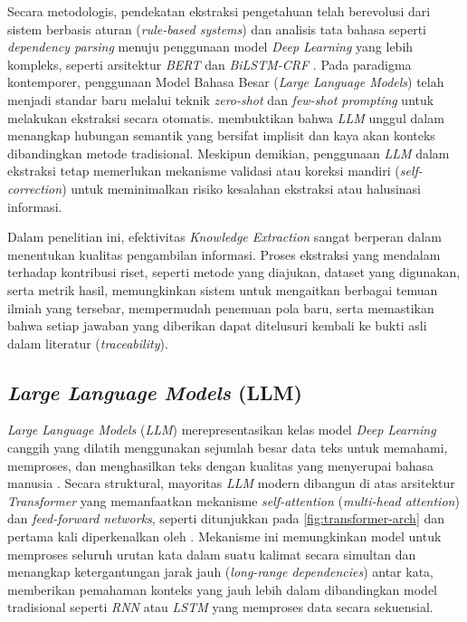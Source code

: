 Secara metodologis, pendekatan ekstraksi pengetahuan telah berevolusi dari sistem berbasis aturan (\textit{rule-based systems}) dan analisis tata bahasa seperti \textit{dependency parsing} menuju penggunaan model \textit{Deep Learning} yang lebih kompleks, seperti arsitektur \textit{BERT} dan \textit{BiLSTM-CRF} \citep{han2025ragvsgraphragsystematic}. Pada paradigma kontemporer, penggunaan Model Bahasa Besar (\textit{Large Language Models}) telah menjadi standar baru melalui teknik \textit{zero-shot} dan \textit{few-shot prompting} untuk melakukan ekstraksi secara otomatis. \cite{sanmartin2024kgragbridginggapknowledge} membuktikan bahwa \textit{LLM} unggul dalam menangkap hubungan semantik yang bersifat implisit dan kaya akan konteks dibandingkan metode tradisional. Meskipun demikian, penggunaan \textit{LLM} dalam ekstraksi tetap memerlukan mekanisme validasi atau koreksi mandiri (\textit{self-correction}) untuk meminimalkan risiko kesalahan ekstraksi atau halusinasi informasi.

Dalam penelitian ini, efektivitas \textit{Knowledge Extraction} sangat berperan dalam menentukan kualitas pengambilan informasi. Proses ekstraksi yang mendalam terhadap kontribusi riset, seperti metode yang diajukan, dataset yang digunakan, serta metrik hasil, memungkinkan sistem untuk mengaitkan berbagai temuan ilmiah yang tersebar, mempermudah penemuan pola baru, serta memastikan bahwa setiap jawaban yang diberikan dapat ditelusuri kembali ke bukti asli dalam literatur (\textit{traceability}).

\subsection{\textit{Large Language Models} (LLM)}

\textit{Large Language Models} (\textit{LLM})  merepresentasikan kelas model \textit{Deep Learning} canggih yang dilatih menggunakan sejumlah besar data teks untuk memahami, memproses, dan menghasilkan teks dengan kualitas yang menyerupai bahasa manusia \citep{zhao2025surveylargelanguagemodels}. Secara struktural, mayoritas \textit{LLM} modern dibangun di atas arsitektur \textit{Transformer} yang memanfaatkan mekanisme \textit{self-attention} (\textit{multi-head attention}) dan \textit{feed-forward networks}, seperti ditunjukkan pada \ref{fig:transformer-arch} dan pertama kali diperkenalkan oleh \cite{NIPS2017_3f5ee243}. Mekanisme ini memungkinkan model untuk memproses seluruh urutan kata dalam suatu kalimat secara simultan dan menangkap ketergantungan jarak jauh (\textit{long-range dependencies}) antar kata, memberikan pemahaman konteks yang jauh lebih dalam dibandingkan model tradisional seperti \textit{RNN} atau \textit{LSTM} yang memproses data secara sekuensial.

